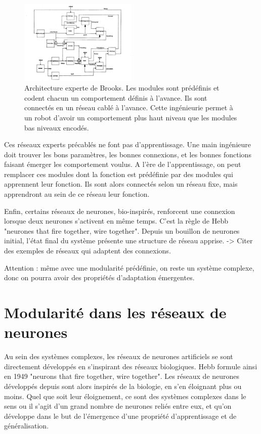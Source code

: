\begin{figure}
\centering
\includegraphics[width=0.5\textwidth]{brooks.pdf}
\caption{Architecture experte de Brooks. Les modules sont prédéfinis et codent chacun un comportement définis à l'avance. Ils sont connectés en un réseau cablé à l'avance. Cette ingénieurie permet à un robot d'avoir un comportement plus haut niveau que les modules bas niveaux encodés.}
\label{fig:brooks}
\end{figure}

Ces réseaux experts précablés ne font pas d'apprentissage. Une main ingénieure doit trouver les bons paramètres, les bonnes connexions, et les bonnes fonctions faisant émerger les comportement voulus. A l'ère de l'apprentissage, on peut remplacer ces modules dont la fonction est prédéfinie par des modules qui apprennent leur fonction. Ils sont alors connectés selon un réseau fixe, mais apprendront au sein de ce réseau leur fonction. 

Enfin, certains réseaux de neurones, bio-inspirés, renforcent une connexion lorsque deux neurones s'activent en même temps. C'est la règle de Hebb "neurones that fire together, wire together". Depuis un bouillon de neurones initial, l'état final du système présente une structure de réseau apprise.  -> Citer des exemples de réseaux qui adaptent des connexions. 


Attention : même avec une modularité prédéfinie, on reste un système complexe, donc on pourra avoir des propriétés d'adaptation émergentes.
 

\section{Modularité dans les réseaux de neurones}

Au sein des systèmes complexes, les réseaux de neurones artificiels se sont directement développés en s'inspirant des réseaux biologiques. Hebb formule ainsi en 1949 "neurons that fire together, wire together". Les réseaux de neurones développés depuis sont alors inspirés de la biologie, en s'en éloignant plus ou moins. Quel que soit leur éloignement, ce sont des systèmes complexes dans le sens ou il s'agit d'un grand nombre de neurones reliés entre eux, et qu'on développe dans le but de l'émergence d'une propriété d'apprentissage et de généralisation.

